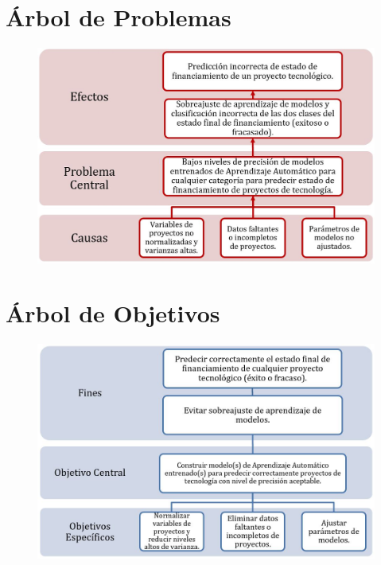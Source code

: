 \begin{appendices} 
\chapter{Árbol de Problemas}
\label{anexo1}
\begin{figure}[h]
	\begin{center}
		\includegraphics[width=1.0\textwidth]{anexos/arbol_problemas.jpg}
	\end{center}
\end{figure}

\chapter{Árbol de Objetivos}
\label{anexo2}
\begin{figure}[h]
	\begin{center}
		\includegraphics[width=1.0\textwidth]{anexos/arbol_objetivos.jpg}
	\end{center}
\end{figure}



\end{appendices}
